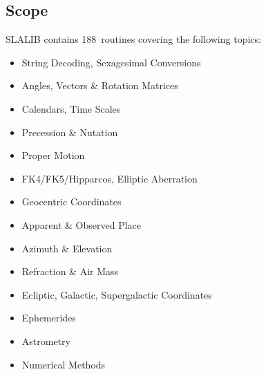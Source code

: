 \documentclass[11pt,twoside]{article}
\newcommand{\nroutines} {188}
\begin{document}
\subsection{Scope}
SLALIB contains \nroutines\ routines covering the following topics:
\begin{itemize}
\item String Decoding,
      Sexagesimal Conversions
\item Angles, Vectors \& Rotation Matrices
\item Calendars,
      Time Scales
\item Precession \& Nutation
\item Proper Motion
\item FK4/FK5/Hipparcos,
      Elliptic Aberration
\item Geocentric Coordinates
\item Apparent \& Observed Place
\item Azimuth \& Elevation
\item Refraction \& Air Mass
\item Ecliptic,
      Galactic,
      Supergalactic Coordinates
\item Ephemerides
\item Astrometry
\item Numerical Methods
\end{itemize}
\end{document}
